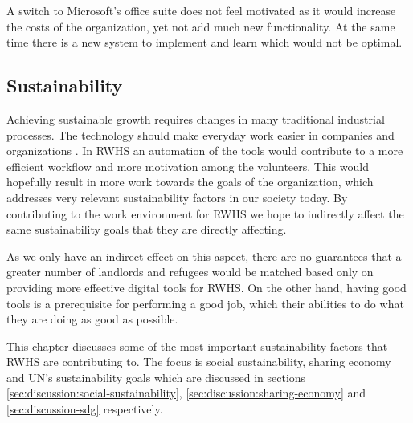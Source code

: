 A switch to Microsoft's office suite does not feel motivated as it would increase the costs of the organization, yet not add much new functionality. At the same time there is a new system to implement and learn which would not be optimal.

\subsection{Sustainability}
Achieving sustainable growth requires changes in many traditional industrial processes. The technology should make everyday work easier in companies and organizations \cite{Vergragt}. In RWHS an automation of the tools would contribute to a more efficient workflow and more motivation among the volunteers. This would hopefully result in more work towards the goals of the organization, which addresses very relevant sustainability factors in our society today. By contributing to the work environment for RWHS we hope to indirectly affect the same sustainability goals that they are directly affecting.

As we only have an indirect effect on this aspect, there are no guarantees that a greater number of landlords and refugees would be matched based only on providing more effective digital tools for RWHS. On the other hand, having good tools is a prerequisite for performing a good job, which  their abilities to do what they are doing as good as possible.

This chapter discusses some of the most important sustainability factors that RWHS are contributing to. The focus is social sustainability, sharing economy and UN's sustainability goals which are discussed in sections \ref{sec:discussion:social-sustainability}, \ref{sec:discussion:sharing-economy} and \ref{sec:discussion-sdg} respectively.


